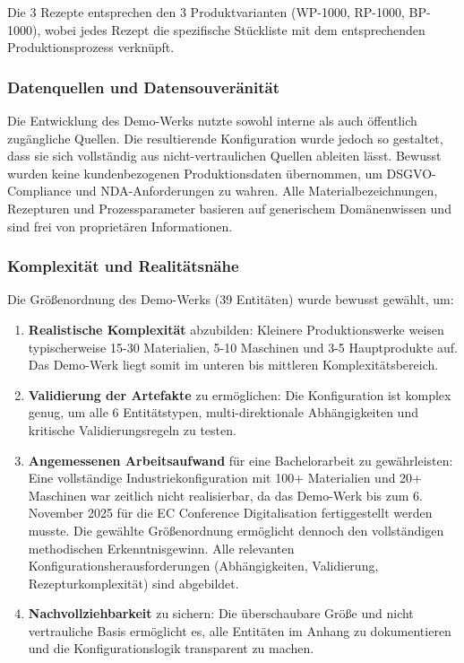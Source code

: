 \noindent Die 3 Rezepte entsprechen den 3 Produktvarianten (WP-1000, RP-1000, BP-1000), wobei jedes Rezept die spezifische Stückliste mit dem entsprechenden Produktionsprozess verknüpft.

\subsubsection{Datenquellen und Datensouveränität}

Die Entwicklung des Demo-Werks nutzte sowohl interne als auch öffentlich zugängliche Quellen. Die resultierende Konfiguration wurde jedoch so gestaltet, dass sie sich vollständig aus nicht-vertraulichen Quellen ableiten lässt. Bewusst wurden keine kundenbezogenen Produktionsdaten übernommen, um DSGVO-Compliance und NDA-Anforderungen zu wahren. Alle Materialbezeichnungen, Rezepturen und Prozessparameter basieren auf generischem Domänenwissen und sind frei von proprietären Informationen.

\subsubsection{Komplexität und Realitätsnähe}

Die Größenordnung des Demo-Werks (39 Entitäten) wurde bewusst gewählt, um:

\begin{enumerate}
    \item \textbf{Realistische Komplexität} abzubilden: Kleinere Produktionswerke weisen typischerweise 15-30 Materialien, 5-10 Maschinen und 3-5 Hauptprodukte auf. Das Demo-Werk liegt somit im unteren bis mittleren Komplexitätsbereich.

    \item \textbf{Validierung der Artefakte} zu ermöglichen: Die Konfiguration ist komplex genug, um alle 6 Entitätstypen, multi-direktionale Abhängigkeiten und kritische Validierungsregeln zu testen.

    \item \textbf{Angemessenen Arbeitsaufwand} für eine Bachelorarbeit zu gewährleisten: Eine vollständige Industriekonfiguration mit 100+ Materialien und 20+ Maschinen war zeitlich nicht realisierbar, da das Demo-Werk bis zum 6. November 2025 für die EC Conference Digitalisation fertiggestellt werden musste. Die gewählte Größenordnung ermöglicht dennoch den vollständigen methodischen Erkenntnisgewinn. Alle relevanten Konfigurationsherausforderungen (Abhängigkeiten, Validierung, Rezepturkomplexität) sind abgebildet.

    \item \textbf{Nachvollziehbarkeit} zu sichern: Die überschaubare Größe und nicht vertrauliche Basis ermöglicht es, alle Entitäten im Anhang zu dokumentieren und die Konfigurationslogik transparent zu machen.
\end{enumerate}

